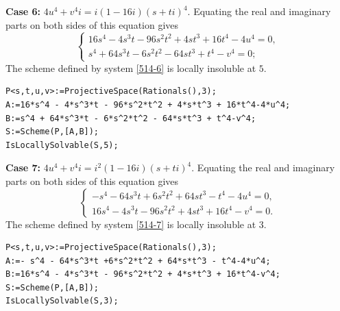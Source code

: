 \documentclass[a4paper,12pt,english,reqno]{amsart}
\begin{document}
{\bf Case 6:} $4u^4+v^4i=i(1-16i)(s+ti)^4$. Equating the real and imaginary parts on both sides of this equation gives
\begin{equation}\label{514-6}
\begin{cases}
16s^4 - 4s^3t - 96s^2t^2 + 4st^3 + 16t^4-4u^4=0,\\
s^4 + 64s^3t - 6s^2t^2 - 64st^3 + t^4-v^4=0;
\end{cases}
\end{equation}
The scheme defined by system \eqref{514-6} is locally insoluble at $5$.


%
\begin{lstlisting}
P<s,t,u,v>:=ProjectiveSpace(Rationals(),3);
A:=16*s^4 - 4*s^3*t - 96*s^2*t^2 + 4*s*t^3 + 16*t^4-4*u^4;
B:=s^4 + 64*s^3*t - 6*s^2*t^2 - 64*s*t^3 + t^4-v^4;
S:=Scheme(P,[A,B]);
IsLocallySolvable(S,5);
\end{lstlisting}


{\bf Case 7:} $4u^4+v^4i=i^2(1-16i)(s+ti)^4$. Equating the real and imaginary parts on both sides of this equation gives
\begin{equation}\label{514-7}
\begin{cases}
- s^4 - 64s^3t +6s^2t^2 + 64st^3 - t^4-4u^4=0,\\
16s^4 - 4s^3t - 96s^2t^2 + 4st^3 + 16t^4-v^4=0.
\end{cases}
\end{equation}
The scheme defined by system \eqref{514-7} is locally insoluble at $3$.


\begin{lstlisting}
P<s,t,u,v>:=ProjectiveSpace(Rationals(),3);
A:=- s^4 - 64*s^3*t +6*s^2*t^2 + 64*s*t^3 - t^4-4*u^4;
B:=16*s^4 - 4*s^3*t - 96*s^2*t^2 + 4*s*t^3 + 16*t^4-v^4;
S:=Scheme(P,[A,B]);
IsLocallySolvable(S,3);
\end{lstlisting}
\end{document}
